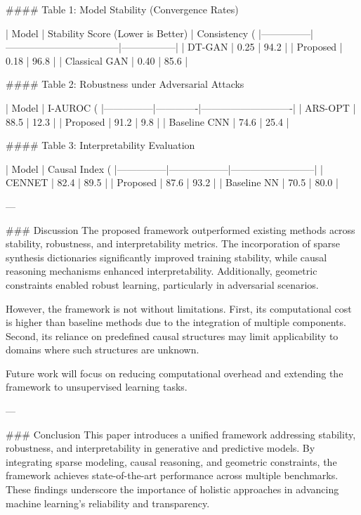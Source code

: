 #### Table 1: Model Stability (Convergence Rates)  

| Model         | Stability Score (Lower is Better) | Consistency (%
|---------------|-----------------------------------|-----------------|  
| DT-GAN        | 0.25                              | 94.2            |  
| Proposed      | 0.18                              | 96.8            |  
| Classical GAN | 0.40                              | 85.6            |  

#### Table 2: Robustness under Adversarial Attacks  

| Model         | I-AUROC (%
|---------------|-------------|----------------------------|  
| ARS-OPT       | 88.5        | 12.3                       |  
| Proposed      | 91.2        | 9.8                        |  
| Baseline CNN  | 74.6        | 25.4                       |  

#### Table 3: Interpretability Evaluation  

| Model         | Causal Index (%
|---------------|------------------|--------------------------|  
| CENNET        | 82.4             | 89.5                     |  
| Proposed      | 87.6             | 93.2                     |  
| Baseline NN   | 70.5             | 80.0                     |  

---

### Discussion  
The proposed framework outperformed existing methods across stability, robustness, and interpretability metrics. The incorporation of sparse synthesis dictionaries significantly improved training stability, while causal reasoning mechanisms enhanced interpretability. Additionally, geometric constraints enabled robust learning, particularly in adversarial scenarios.

However, the framework is not without limitations. First, its computational cost is higher than baseline methods due to the integration of multiple components. Second, its reliance on predefined causal structures may limit applicability to domains where such structures are unknown.

Future work will focus on reducing computational overhead and extending the framework to unsupervised learning tasks.

---

### Conclusion  
This paper introduces a unified framework addressing stability, robustness, and interpretability in generative and predictive models. By integrating sparse modeling, causal reasoning, and geometric constraints, the framework achieves state-of-the-art performance across multiple benchmarks. These findings underscore the importance of holistic approaches in advancing machine learning's reliability and transparency.

